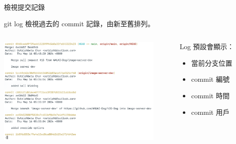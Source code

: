\documentclass[xetex, unicode, 10pt, aspectratio=169]{beamer}
\begin{document}
\begin{frame}{檢視提交記錄}
    \begin{block}{git log}
        檢視過去的 commit 記錄，由新至舊排列。
        \begin{columns}
            \begin{column}{0.6\textwidth}
                \begin{center}
                    \includegraphics[width=3.2in]{./img/git-log.png}
                \end{center}
            \end{column}
            \begin{column}{0.4\textwidth}
                Log 預設會顯示：
                \begin{itemize}
                    \item 當前分支位置
                    \item commit 編號
                    \item commit 時間
                    \item commit 用戶
                \end{itemize}
            \end{column}
        \end{columns}
    \end{block}
\end{frame}
\end{document}
